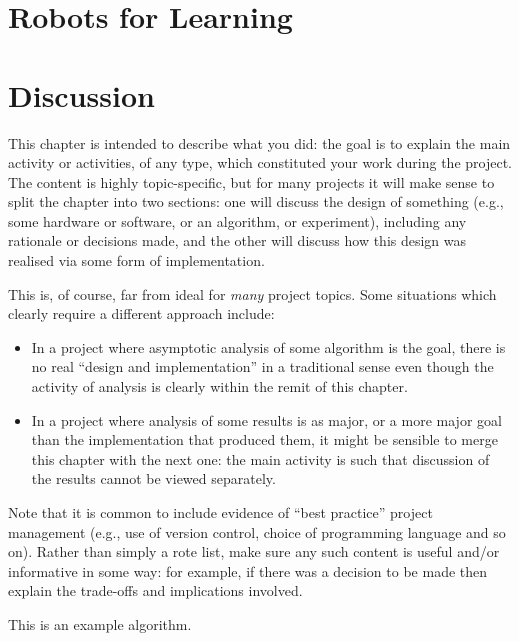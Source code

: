 \documentclass[oneside,%
                    author={Malak Hajji},
                    degree={BSc},
                    title={Designing An Accessible Computational Toolkit For Students},
                  subtitle={With Mixed Visual Abilities}]{dissertation}
\begin{document}
\section{Robots for Learning}
\section{Discussion} 


\noindent
This chapter is intended to describe what you did: the goal is to explain
the main activity or activities, of any type, which constituted your work 
during the project.  The content is highly topic-specific, but for many 
projects it will make sense to split the chapter into two sections: one 
will discuss the design of something (e.g., some hardware or software, or 
an algorithm, or experiment), including any rationale or decisions made, 
and the other will discuss how this design was realised via some form of 
implementation.  

This is, of course, far from ideal for {\em many} project topics.  Some
situations which clearly require a different approach include:

\begin{itemize}
\item In a project where asymptotic analysis of some algorithm is the goal,
      there is no real ``design and implementation'' in a traditional sense
      even though the activity of analysis is clearly within the remit of
      this chapter.
\item In a project where analysis of some results is as major, or a more
      major goal than the implementation that produced them, it might be
      sensible to merge this chapter with the next one: the main activity 
      is such that discussion of the results cannot be viewed separately.
\end{itemize}

\noindent
Note that it is common to include evidence of ``best practice'' project 
management (e.g., use of version control, choice of programming language 
and so on).  Rather than simply a rote list, make sure any such content 
is useful and/or informative in some way: for example, if there was a 
decision to be made then explain the trade-offs and implications 
involved.


\begin{algorithm}[t]
\caption{This is an example algorithm.}
\label{alg}
\end{algorithm}
\end{document}
